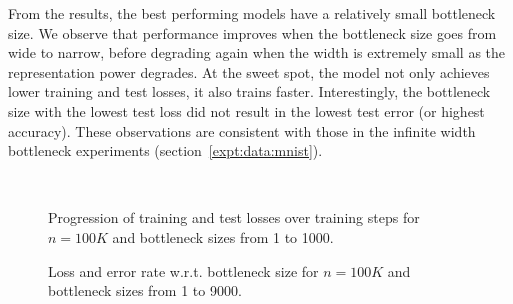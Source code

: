 \documentclass{article}
\theoremstyle{definition}
\theoremstyle{remark}
\renewcommand{\[}{\begin{eqnarray}}
\renewcommand{\]}{\end{eqnarray}}
\renewcommand{\[}{\begin{eqnarray}}
\renewcommand{\]}{\end{eqnarray}}
\begin{document}
From the results, the best performing models have a relatively small bottleneck size. We observe that performance improves when the bottleneck size goes from wide to narrow, before degrading again when the width is extremely small as the representation power degrades. At the sweet spot, the model not only achieves lower training and test losses, it also trains faster. Interestingly, the bottleneck size with the lowest test loss did not result in the lowest test error (or highest accuracy). These observations are consistent with those in the infinite width bottleneck experiments (section~\ref{expt:data:mnist}).




\begin{figure}[ht]
\centering
  \\
  \caption{Progression of training and test losses over training steps for $n=100K$ and bottleneck sizes from 1 to 1000.}
  \label{fig:finite_epoch}
\end{figure}


\begin{figure}[ht]
\centering
{}
  \caption{Loss and error rate w.r.t. bottleneck size for $n=100K$ and bottleneck sizes from 1 to 9000.}%
  \label{fig:finite_d}
\end{figure}
\end{document}
